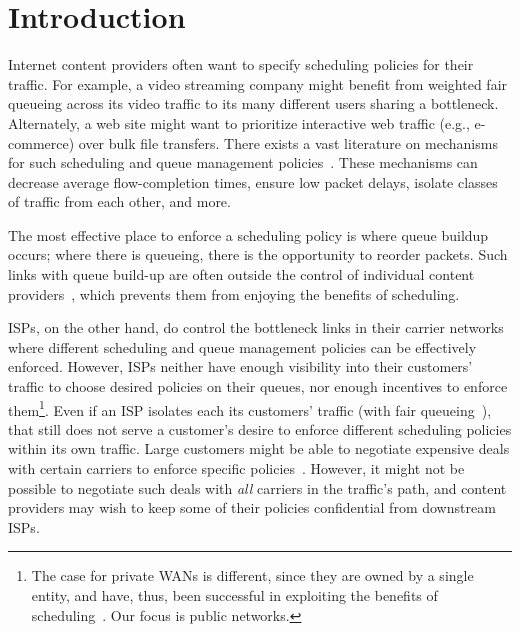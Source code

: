 \section{Introduction}\label{s:intro}

Internet content providers often want to specify scheduling policies for their traffic. 
For example, a video streaming company might benefit from weighted fair queueing across its video traffic to its many different users sharing a bottleneck. Alternately, a web site might want to prioritize interactive web traffic (e.g., e-commerce) over bulk file transfers. 
There exists a vast literature on mechanisms for such scheduling and queue management policies~\cite{diffserv, fair-queueing, sfq, pie, CoDel, fifoplus, virtualClocks, csfq, drr, red, ecn}.
These mechanisms can decrease average flow-completion times, ensure low packet delays, isolate classes of traffic from each other, and more.

The most effective place to enforce a scheduling policy is where queue buildup occurs; where there is queueing, there is the opportunity to reorder packets. Such links with queue build-up are often outside the control of individual content 
providers~\cite{inferring-interdomain-congestion, isp-throttle-1, isp-throttle-2, isp-throttle-3}, which prevents them from enjoying the benefits of scheduling.

ISPs, on the other hand, do control the bottleneck links in their carrier networks where different scheduling and queue management policies can be effectively enforced. 
However, ISPs neither have enough visibility into their customers' traffic to choose desired policies on their queues, nor enough incentives to enforce them\footnote{The case for private WANs is different, since they are owned by a single entity, and have, thus, been successful in exploiting the benefits of scheduling~\cite{swan, b4, bwe}. Our focus is public networks.}. Even if an ISP isolates each its customers' traffic (\eg with fair queueing~\cite{fair-queueing}), that still does not serve a customer's desire to enforce different scheduling policies within its own traffic.  
Large customers might be able to negotiate expensive deals with certain carriers to enforce specific policies~\cite{att-qos}. 
However, it might not be possible to negotiate such deals with \emph{all} carriers in the traffic's path, and content providers may wish to keep some of their policies confidential from downstream ISPs. 


